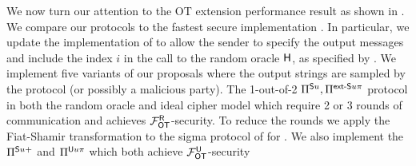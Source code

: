 We now turn our attention to the  OT extension performance result as shown in . We compare our protocols to the fastest secure implementation \cite{C:KelOrsSch15,libOTe}. In particular, we update the \cite{libOTe} implementation of \cite{C:KelOrsSch15} to allow the sender to specify the output messages and include the index $i$ in the call to the random oracle $\mathsf{H}$, as specified by \cite{C:KelOrsSch15}. We implement five variants of our proposals where the output strings are sampled by the protocol (or possibly a malicious party). The 1-out-of-2 $\Pi^{\mathsf{S} u},\Pi^{\textsf{ext-\ensuremath{\mathsf{S}}}u\pi}$ protocol in both the random oracle and ideal cipher model which require 2 or 3 rounds of communication and achieves $\mathcal{F}_{\mathsf{OT}}^\mathsf{R}$-security. To reduce the rounds we apply the Fiat-Shamir transformation to the sigma protocol of \cite{C:KelOrsSch15} for . We also implement the $\Pi^{\mathsf{S} u+}$ and $\Pi^{\mathsf{U} u\pi}$ which both achieve $\mathcal{F}_{\mathsf{OT}}^\mathsf{U}$-security

